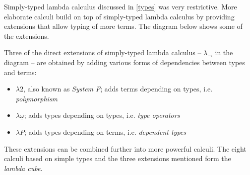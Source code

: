 \documentclass[11pt,twoside,a4paper]{article} %
\begin{document}
Simply-typed lambda calculus discussed in \ref{types} was very restrictive. More 
elaborate calculi build on top of simply-typed lambda calculus by providing
extensions that allow typing of more terms. The diagram below shows some of the 
extensions.
\begin{center}
\end{center}
Three of the direct extensions of simply-typed lambda calculus -- $\lambda_\rightarrow$ in the
diagram -- are obtained by adding various forms of dependencies between types
and terms:
\begin{itemize}
\item $\lambda 2$, also known as \emph{System F}; adds terms depending on
types, i.e. \emph{polymorphism}
\item $\lambda\underline{\omega}$; adds types depending on types, i.e. \emph{type
operators}
\item $\lambda P$; adds types depending on terms, i.e. \emph{dependent types}
\end{itemize}
These extensions can be combined further into more powerful calculi. The eight
calculi based on simple types and the three extensions mentioned form the
\emph{lambda cube}\cite{b91}.
\end{document}
